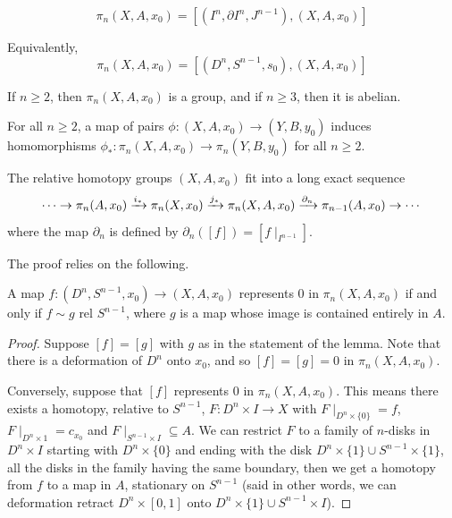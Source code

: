 \documentclass[ma3408.tex]{subfiles}
\begin{document}
\begin{Def}
	\[
\pi_n(X,A,x_0) = [(I^n,\partial I^n,J^{n-1}),(X,A,x_0)]
	\]
\end{Def}
\begin{Rem}
	Equivalently, 
	\[
\pi_n(X,A,x_0) = [(D^n,S^{n-1},s_0),(X,A,x_0)]
	\]
\end{Rem}
\begin{Prop}
	If $n \ge 2$, then $\pi_n(X,A,x_0)$ is a group, and if $n \ge 3$, then it is abelian. 

	For all $n \ge 2$, a map of pairs $\phi \colon (X,A,x_0) \to (Y,B,y_0)$ induces homomorphisms $\phi_* \colon \pi_n(X,A,x_0) \to \pi_n(Y,B,y_0)$ for all $n \ge 2$. 
\end{Prop}
\begin{Thm}\label{thm:les_rel}
	The relative homotopy groups $(X,A,x_0)$ fit into a long exact sequence 
	\[
\cdots \to \pi_n(A,x_0) \xrightarrow{i_*} \pi_n(X,x_0) \xrightarrow{j_*} \pi_n(X,A,x_0) \xrightarrow{\partial_n} \pi_{n-1}(A,x_0) \to \cdots
	\]
	where the map $\partial_n$ is defined by $\partial_n([f]) = [f\mid_{I^{n-1}}]$. 
\end{Thm}
The proof relies on the following.
\begin{Lem}
	A map $f \colon (D^n,S^{n-1},x_0) \to (X,A,x_0)$ represents 0 in $\pi_n(X,A,x_0)$ if and only if $f \sim g \text{ rel } S^{n-1}$, where $g$ is a map whose image is contained entirely in $A$. 
\end{Lem}
\begin{proof}
	Suppose $[f] = [g]$ with $g$ as in the statement of the lemma. Note that there is a deformation of $D^n$ onto $x_0$, and so $[f] = [g] = 0$ in $\pi_n(X,A,x_0)$. 

	Conversely, suppose that $[f]$ represents 0 in $\pi_n(X,A,x_0)$. This means there exists a homotopy, relative to $S^{n-1}$, $F \colon D^n \times I \to X$ with $F \mid_{D^n \times \{0 \}} = f$, $F \mid_{D^n \times 1} = c_{x_0}$ and $F \mid_{S^{n-1} \times I} \subseteq A$. We can restrict $F$ to a family of $n$-disks in $D^n \times I$ starting with $D^n \times \{ 0 \}$ and ending with the disk $D^n \times \{1 \} \cup S^{n-1} \times \{ 1\}$, all the disks in the family having the same boundary, then we get a homotopy from $f$ to a map in $A$, stationary on $S^{n-1}$ (said in other words, we can deformation retract $D^n \times [0,1]$ onto $D^n \times \{1 \} \cup S^{n-1} \times I$). 
\end{proof}
\end{document}
